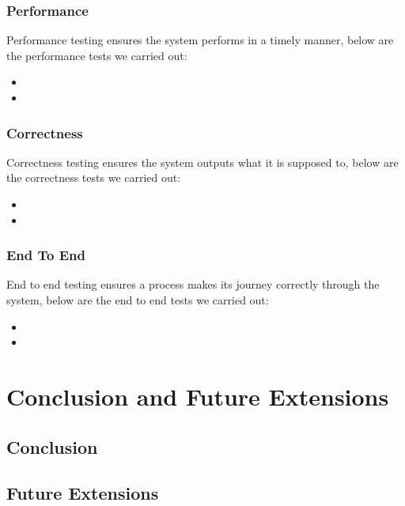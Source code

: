 \documentclass[11pt]{article}
\begin{document}
\subsubsection{Performance}
Performance testing ensures the system performs in a timely manner, below are the performance tests we carried out: 
\begin{itemize}
\item
\item
\end{itemize}
\subsubsection{Correctness}
Correctness testing ensures the system outputs what it is supposed to, below are the correctness tests we carried out:
\begin{itemize}
\item
\item
\end{itemize}
\subsubsection{End To End}
End to end testing ensures a process makes its journey correctly through the system, below are the end to end tests we carried out:
\begin{itemize}
\item
\item
\end{itemize}


\section{Conclusion and Future Extensions}

\subsection{Conclusion}

\subsection{Future Extensions}
\end{document}
